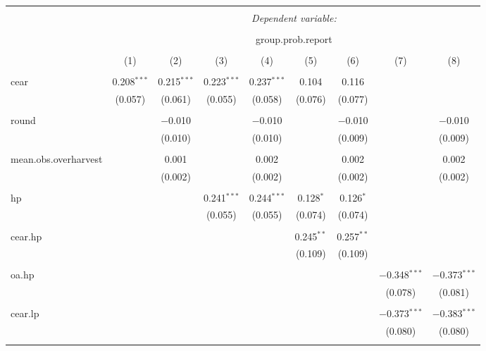 \documentclass[
]{article}
\begin{document}
\begin{table}[!htbp] \centering 
  \caption{} 
  \label{} 
\begin{tabular}{@{\extracolsep{5pt}}lcccccccc} 
\\[-1.8ex]\hline 
\hline \\[-1.8ex] 
 & \multicolumn{8}{c}{\textit{Dependent variable:}} \\ 
\cline{2-9} 
\\[-1.8ex] & \multicolumn{8}{c}{group.prob.report} \\ 
\\[-1.8ex] & (1) & (2) & (3) & (4) & (5) & (6) & (7) & (8)\\ 
\hline \\[-1.8ex] 
 cear & 0.208$^{***}$ & 0.215$^{***}$ & 0.223$^{***}$ & 0.237$^{***}$ & 0.104 & 0.116 &  &  \\ 
  & (0.057) & (0.061) & (0.055) & (0.058) & (0.076) & (0.077) &  &  \\ 
  & & & & & & & & \\ 
 round &  & $-$0.010 &  & $-$0.010 &  & $-$0.010 &  & $-$0.010 \\ 
  &  & (0.010) &  & (0.010) &  & (0.009) &  & (0.009) \\ 
  & & & & & & & & \\ 
 mean.obs.overharvest &  & 0.001 &  & 0.002 &  & 0.002 &  & 0.002 \\ 
  &  & (0.002) &  & (0.002) &  & (0.002) &  & (0.002) \\ 
  & & & & & & & & \\ 
 hp &  &  & 0.241$^{***}$ & 0.244$^{***}$ & 0.128$^{*}$ & 0.126$^{*}$ &  &  \\ 
  &  &  & (0.055) & (0.055) & (0.074) & (0.074) &  &  \\ 
  & & & & & & & & \\ 
 cear.hp &  &  &  &  & 0.245$^{**}$ & 0.257$^{**}$ &  &  \\ 
  &  &  &  &  & (0.109) & (0.109) &  &  \\ 
  & & & & & & & & \\ 
 oa.hp &  &  &  &  &  &  & $-$0.348$^{***}$ & $-$0.373$^{***}$ \\ 
  &  &  &  &  &  &  & (0.078) & (0.081) \\ 
  & & & & & & & & \\ 
 cear.lp &  &  &  &  &  &  & $-$0.373$^{***}$ & $-$0.383$^{***}$ \\ 
  &  &  &  &  &  &  & (0.080) & (0.080) \\ 
  & & & & & & & & \\ 

\end{tabular}
\end{table}
\end{document}
